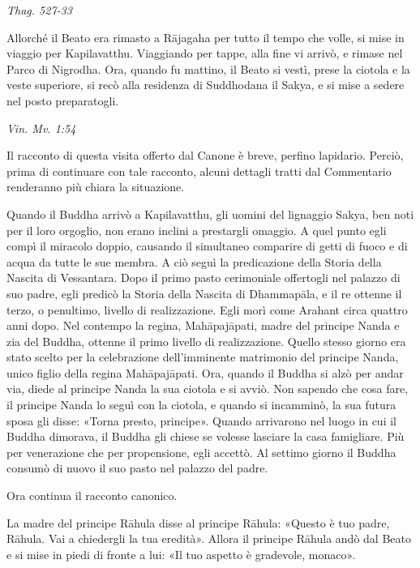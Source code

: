 \emph{Thag. 527-33}


 Allorché il Beato era rimasto a Rājagaha per tutto il
tempo che volle, si mise in viaggio per Kapilavatthu. Viaggiando per
tappe, alla fine vi arrivò, e rimase nel Parco di Nigrodha. Ora, quando
fu mattino, il Beato si vestì, prese la ciotola e la veste superiore, si
recò alla residenza di Suddhodana il Sakya, e si mise a sedere nel posto
preparatogli.


\emph{Vin. Mv. 1:54}


 Il racconto di questa visita offerto dal Canone è
breve, perfino lapidario. Perciò, prima di continuare con tale racconto,
alcuni dettagli tratti dal Commentario renderanno più chiara la
situazione.


 Quando il Buddha arrivò a Kapilavatthu, gli uomini
del lignaggio Sakya, ben noti per il loro orgoglio, non erano inclini a
prestargli omaggio. A quel punto egli compì il miracolo doppio, causando
il simultaneo comparire di getti di fuoco e di acqua da tutte le sue
membra. A ciò seguì la predicazione della Storia della Nascita di
Vessantara. Dopo il primo pasto cerimoniale offertogli nel palazzo di
suo padre, egli predicò la Storia della Nascita di Dhammapāla, e il re
ottenne il terzo, o penultimo, livello di realizzazione. Egli morì come
Arahant circa quattro anni dopo. Nel contempo la regina, Mahāpajāpati,
madre del principe Nanda e zia del Buddha, ottenne il primo livello di
realizzazione. Quello stesso giorno era stato scelto per la celebrazione
dell’imminente matrimonio del principe Nanda, unico figlio della regina
Mahāpajāpati. Ora, quando il Buddha si alzò per andar via, diede al
principe Nanda la sua ciotola e si avviò. Non sapendo che cosa fare, il
principe Nanda lo seguì con la ciotola, e quando si incamminò, la sua
futura sposa gli disse: «Torna presto, principe». Quando arrivarono nel
luogo in cui il Buddha dimorava, il Buddha gli chiese se volesse
lasciare la casa famigliare. Più per venerazione che per propensione,
egli accettò. Al settimo giorno il Buddha consumò di nuovo il suo pasto
nel palazzo del padre.


 Ora continua il racconto canonico.


 La madre del principe Rāhula disse al principe Rāhula:
«Questo è tuo padre, Rāhula. Vai a chiedergli la tua eredità». Allora il
principe Rāhula andò dal Beato e si mise in piedi di fronte a lui: «Il
tuo aspetto è gradevole, monaco».


